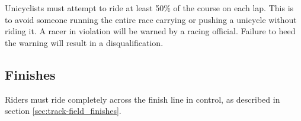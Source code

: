 Unicyclists must attempt to ride at least 50\% of the course on each lap.
This is to avoid someone running the entire race carrying or pushing a unicycle without riding it. 
A racer in violation will be warned by a racing official.
Failure to heed the warning will result in a disqualification.

\subsection{Finishes}

Riders must ride completely across the finish line in control, as described in section \ref{sec:track-field_finishes}.
